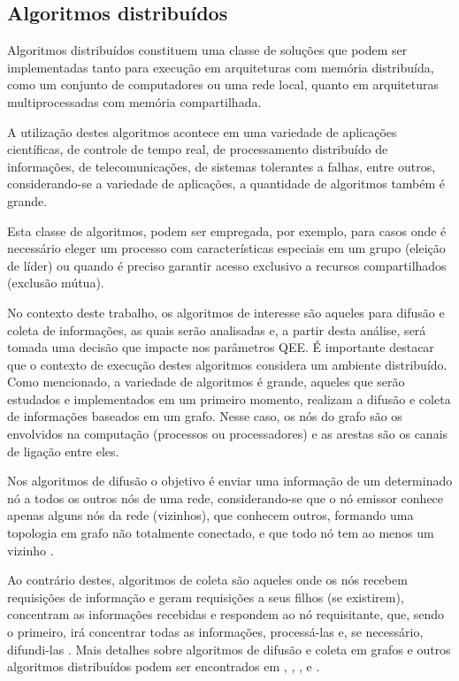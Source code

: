 \subsection{Algoritmos distribuídos}
\par
Algoritmos distribuídos constituem uma classe de soluções que podem ser implementadas tanto para execução em arquiteturas com memória distribuída, como um conjunto de computadores ou uma rede local, quanto em arquiteturas multiprocessadas com memória compartilhada. 
\par
A utilização destes algoritmos acontece em uma variedade de aplicações científicas, de controle de tempo real, de processamento distribuído de informações, de telecomunicações, de sistemas tolerantes a falhas, entre outros, considerando-se a variedade de aplicações, a quantidade de algoritmos também é grande. 
\par 
Esta classe de algoritmos, podem ser empregada, por exemplo, para casos onde é necessário eleger um processo com características especiais em um grupo (eleição de líder) ou quando é preciso garantir acesso exclusivo a recursos compartilhados (exclusão mútua). 
\par
No contexto deste trabalho, os algoritmos de interesse são aqueles para difusão e coleta de informações, as quais serão analisadas e, a partir desta análise, será tomada uma decisão que impacte nos parâmetros QEE. É importante destacar que o contexto de execução destes algoritmos considera um ambiente distribuído. Como mencionado, a variedade de algoritmos é grande, aqueles que serão estudados e implementados em um primeiro momento, realizam a difusão e coleta de informações baseados em um grafo. Nesse caso, os nós do grafo são os envolvidos na computação (processos ou processadores) e as arestas são os canais de ligação entre eles.
\par
Nos algoritmos de difusão o objetivo é enviar uma informação de um determinado nó a todos os outros nós de uma rede, considerando-se que o nó emissor conhece apenas alguns nós da rede (vizinhos), que conhecem outros, formando uma topologia em grafo não totalmente conectado, e que todo nó tem ao menos um vizinho \citep{GEY12}. 
\par
Ao contrário destes, algoritmos de coleta são aqueles onde os nós recebem requisições de informação e geram requisições a seus filhos (se existirem), concentram as informações recebidas e respondem ao nó requisitante, que, sendo o primeiro, irá concentrar todas as informações, processá-las e, se necessário, difundi-las \citep{GEY12}. Mais detalhes sobre algoritmos de difusão e coleta em grafos e outros algoritmos distribuídos podem ser encontrados em \cite{AND00}, \cite{BAR96}, \cite{COU01}, \cite{LYN96} e \cite{TAN01}.
